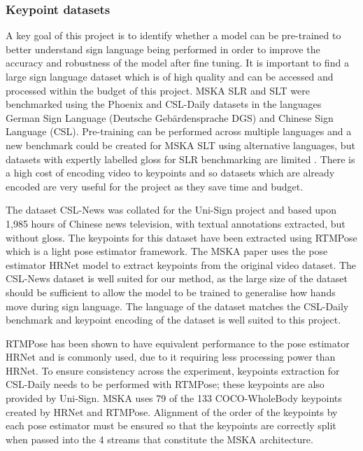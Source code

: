 \documentclass{article}
\begin{document}
\subsubsection{Keypoint datasets}
A key goal of this project is to identify whether a model can be pre-trained to better understand sign language being performed in order to improve the accuracy and robustness of the model after fine tuning. It is important to find a large sign language dataset which is of high quality and can be accessed and processed within the budget of this project. MSKA SLR and SLT were benchmarked using the Phoenix and CSL-Daily datasets in the languages German Sign Language (Deutsche Gebärdensprache DGS) and Chinese Sign Language (CSL). Pre-training can be performed across multiple languages and a new benchmark could be created for MSKA SLT using alternative languages, but datasets with expertly labelled gloss for SLR benchmarking are limited \cite{vedaldi_bsl-1k_2020}. There is a high cost of encoding video to keypoints and so datasets which are already encoded are very useful for the project as they save time and budget.    

The dataset CSL-News was collated for the Uni-Sign project and based upon 1,985 hours of Chinese news television, with textual annotations extracted, but without gloss. The keypoints for this dataset have been extracted using RTMPose which is a light pose estimator framework. The MSKA paper uses the pose estimator HRNet model to extract keypoints from the original video dataset. The CSL-News dataset is well suited for our method, as the large size of the dataset should be sufficient to allow the model to be trained to generalise how hands move during sign language. The language of the dataset matches the CSL-Daily benchmark and keypoint encoding of the dataset is well suited to this project.

RTMPose has been shown to have equivalent performance to the pose estimator HRNet and is commonly used, due to it requiring less processing power than HRNet. To ensure consistency across the experiment, keypoints extraction for CSL-Daily needs to be performed with RTMPose; these keypoints are also provided by Uni-Sign. MSKA uses 79 of the 133 COCO-WholeBody keypoints created by HRNet and RTMPose. Alignment of the order of the keypoints by each pose estimator must be ensured so that the keypoints are correctly split when passed into the 4 streams that constitute the MSKA architecture. 
\end{document}
